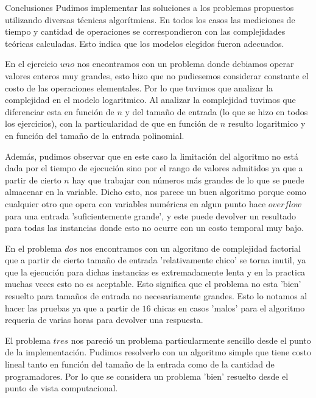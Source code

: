 \documentclass[12pt,titlepage]{article}
\begin{document}
	\newpage
	
	\begin{section}{Conclusiones}
		Pudimos implementar las soluciones a los problemas propuestos utilizando diversas técnicas algorítmicas. En todos los casos las mediciones de tiempo y cantidad de operaciones se correspondieron con las complejidades teóricas calculadas. Esto indica que los modelos elegidos fueron adecuados.

		En el ejercicio $uno$ nos encontramos con un problema donde debiamos operar valores enteros muy grandes, esto hizo que no pudiesemos considerar constante el costo de las operaciones elementales. Por lo que tuvimos que analizar la complejidad en el modelo logaritmico. Al analizar la complejidad tuvimos que diferenciar esta en función de $n$ y del tamaño de entrada (lo que se hizo en todos los ejercicios), con la particularidad de que en función de $n$ resulto logaritmico y en función del tamaño de la entrada polinomial.
		
		Además, pudimos observar que en este caso la limitación del algoritmo no está dada por el tiempo de ejecución sino por el rango de valores admitidos ya que a partir de cierto $n$ hay que trabajar con números más grandes de lo que se puede almacenar en la variable. Dicho esto, nos parece un buen algoritmo porque como cualquier otro que opera con variables numéricas en algun punto hace $overflow$ para una entrada 'suficientemente grande', y este puede devolver un resultado para todas las instancias donde esto no ocurre con un costo temporal muy bajo.

		En el problema $dos$ nos encontramos con un algoritmo de complejidad factorial que a partir de cierto tamaño de entrada 'relativamente chico' se torna inutil, ya que la ejecución para dichas instancias es extremadamente lenta y en la practica muchas veces esto no es aceptable. Esto significa que el problema no esta 'bien' resuelto para tamaños de entrada no necesariamente grandes. Esto lo notamos al hacer las pruebas ya que a partir de $16$ chicas en casos 'malos' para el algoritmo requeria de varias horas para devolver una respuesta.
		
		El problema $tres$ nos pareció un problema particularmente sencillo desde el punto de la implementación. Pudimos resolverlo con un algoritmo simple que tiene costo lineal tanto en función del tamaño de la entrada como de la cantidad de programadores. Por lo que se considera un problema 'bien' resuelto desde el punto de vista computacional.
	\end{section}
\end{document}
